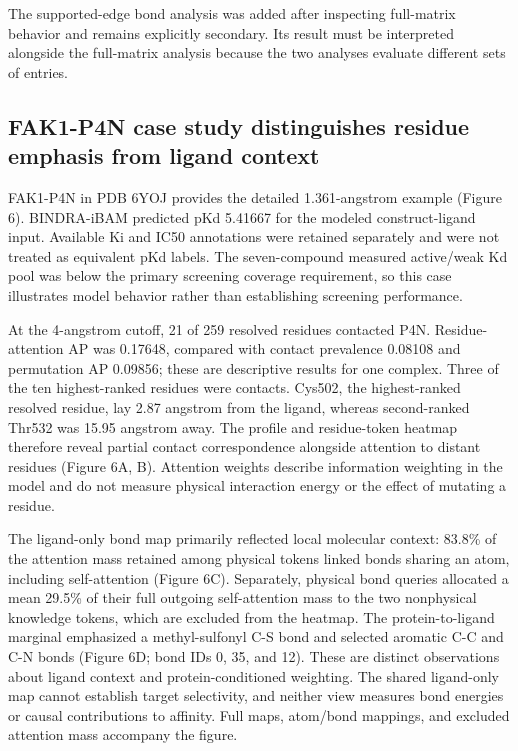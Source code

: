 \documentclass[12pt,a4paper]{article}
\begin{document}
The supported-edge bond analysis was added after inspecting full-matrix behavior and remains explicitly secondary. Its result must be interpreted alongside the full-matrix analysis because the two analyses evaluate different sets of entries.

\subsection*{FAK1-P4N case study distinguishes residue emphasis from ligand context}
FAK1-P4N in PDB 6YOJ provides the detailed 1.361-angstrom example (Figure 6). BINDRA-iBAM predicted pKd 5.41667 for the modeled construct-ligand input. Available Ki and IC50 annotations were retained separately and were not treated as equivalent pKd labels. The seven-compound measured active/weak Kd pool was below the primary screening coverage requirement, so this case illustrates model behavior rather than establishing screening performance.

At the 4-angstrom cutoff, 21 of 259 resolved residues contacted P4N. Residue-attention AP was 0.17648, compared with contact prevalence 0.08108 and permutation AP 0.09856; these are descriptive results for one complex. Three of the ten highest-ranked residues were contacts. Cys502, the highest-ranked resolved residue, lay 2.87 angstrom from the ligand, whereas second-ranked Thr532 was 15.95 angstrom away. The profile and residue-token heatmap therefore reveal partial contact correspondence alongside attention to distant residues (Figure 6A, B). Attention weights describe information weighting in the model and do not measure physical interaction energy or the effect of mutating a residue.

The ligand-only bond map primarily reflected local molecular context: 83.8\% of the attention mass retained among physical tokens linked bonds sharing an atom, including self-attention (Figure 6C). Separately, physical bond queries allocated a mean 29.5\% of their full outgoing self-attention mass to the two nonphysical knowledge tokens, which are excluded from the heatmap. The protein-to-ligand marginal emphasized a methyl-sulfonyl C-S bond and selected aromatic C-C and C-N bonds (Figure 6D; bond IDs 0, 35, and 12). These are distinct observations about ligand context and protein-conditioned weighting. The shared ligand-only map cannot establish target selectivity, and neither view measures bond energies or causal contributions to affinity. Full maps, atom/bond mappings, and excluded attention mass accompany the figure.
\end{document}

